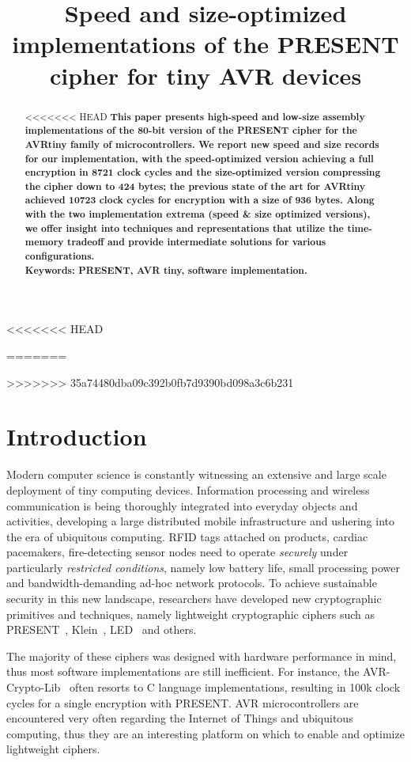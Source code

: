 \documentclass[11pt]{article}
\begin{document}
<<<<<<< HEAD

=======
\title{Speed and size-optimized implementations of the PRESENT cipher for tiny AVR devices}
\institute{}
>>>>>>> 35a74480dba09c392b0fb7d9390bd098a3c6b231
\author{}
\date{}
\maketitle

\begin{abstract}
<<<<<<< HEAD
\textbf{This paper presents high-speed and low-size assembly implementations of the 80-bit version of the PRESENT cipher for the AVRtiny family of microcontrollers. We report new speed and size records for our implementation, with the speed-optimized version achieving a full encryption in 8721 clock cycles and the size-optimized version compressing the cipher down to 424 bytes; the previous state of the art for AVRtiny achieved 10723 clock cycles for encryption with a size of 936 bytes. Along with the two implementation extrema (speed \& size optimized versions), we offer insight into techniques and representations that utilize the time-memory tradeoff and provide intermediate solutions for various configurations.\\Keywords: PRESENT, AVR tiny, software implementation.}
\end{abstract}
\section{Introduction}
Modern computer science is constantly witnessing an extensive and large scale deployment of tiny computing devices. Information processing and wireless communication is being thoroughly integrated into everyday objects and activities, developing a large distributed mobile infrastructure and ushering into the era of ubiquitous computing. RFID tags attached on products, cardiac pacemakers, fire-detecting sensor nodes need to operate \emph{securely} under particularly \emph{restricted conditions}, namely low battery life, small processing power and bandwidth-demanding ad-hoc network protocols. To achieve sustainable security in this new landscape, researchers have developed new cryptographic primitives and techniques, namely lightweight cryptographic ciphers such as PRESENT~\cite{bogdanov2007present}, Klein~\cite{gong2012klein}, LED~\cite{guo2011led} and others.

The majority of these ciphers was designed with hardware performance in mind, thus most software implementations are still inefficient. For instance, the AVR-Crypto-Lib~\cite{avr_crypto_lib} often resorts to C language implementations, resulting in 100k clock cycles for a single encryption with PRESENT. AVR microcontrollers are encountered very often regarding the Internet of Things and ubiquitous computing, thus they are an interesting platform on which to enable and optimize lightweight ciphers.
\end{document}
